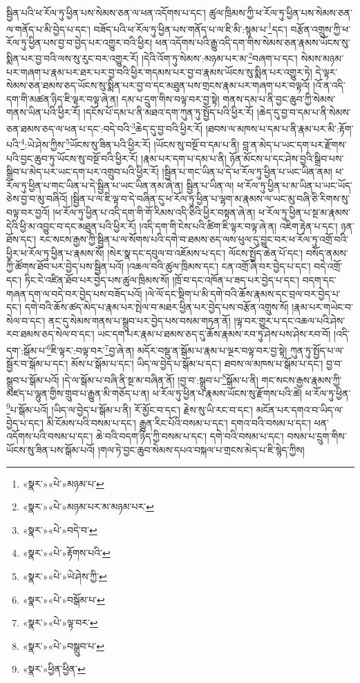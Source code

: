 སྦྱིན་པའི་ཕ་རོལ་ཏུ་ཕྱིན་པས་སེམས་ཅན་ལ་ཕན་འདོགས་པ་དང་། ཚུལ་ཁྲིམས་ཀྱི་ཕ་རོལ་ཏུ་ཕྱིན་པས་སེམས་ཅན་ལ་གནོད་པ་མི་བྱེད་པ་དང་། བཟོད་པའི་ཕ་རོལ་ཏུ་ཕྱིན་པས་གནོད་པ་ལ་ཇི་མི་:སྙམ་པ་\footnote{«སྣར་»«པེ་»མཉམ་པ་}དང་། བརྩོན་འགྲུས་ཀྱི་ཕ་རོལ་ཏུ་ཕྱིན་པས་བྱ་བ་བྱེད་པར་འགྱུར་བའི་ཕྱིར། ཕན་འདོགས་པའི་རྒྱུ་འདི་དག་གིས་སེམས་ཅན་རྣམས་ཡོངས་སུ་སྨིན་པར་བྱ་བའི་ལས་སུ་རུང་བར་འགྱུར་རོ། །དེའི་འོག་ཏུ་སེམས་:མཉམ་པར་མ་\footnote{«སྣར་»«པེ་»མཉམ་པར་མ་མཉམ་པར་}བཞག་པ་དང་། སེམས་མཉམ་པར་གཞག་པ་རྣམ་པར་ཐར་པར་བྱ་བའི་ཕྱིར་གདམས་པར་བྱ་བ་རྣམས་ཡོངས་སུ་སྨིན་པར་འགྱུར་ཏེ། དེ་ལྟར་སེམས་ཅན་ཐམས་ཅད་ཡོངས་སུ་སྨིན་པར་བྱ་བ་དང་མཐུན་པས་གྲངས་རྣམ་པར་གཞག་པར་བལྟའོ། །འོ་ན་འདི་དག་གི་མཚན་ཉིད་ཇི་ལྟར་བལྟ་ཞེ་ན། དམ་པ་དྲུག་གིས་བལྟ་བར་བྱ་སྟེ། གནས་དམ་པ་ནི་བྱང་ཆུབ་ཀྱི་སེམས་གནས་ཡིན་པའི་ཕྱིར་རོ། །དངོས་པོ་དམ་པ་ནི་མཐའ་དག་ཀུན་ཏུ་སྤྱོད་པའི་ཕྱིར་རོ། །ཆེད་དུ་བྱ་བ་དམ་པ་ནི་སེམས་ཅན་ཐམས་ཅད་ལ་ཕན་པ་དང་:བདེ་བའི་\footnote{«སྣར་»«པེ་»བདེ་བ་}ཆེད་དུ་བྱ་བའི་ཕྱིར་རོ། །ཐབས་ལ་མཁས་པ་དམ་པ་ནི་རྣམ་པར་མི་:རྟོག་པའི་\footnote{«སྣར་»«པེ་»རྟོགས་པའི་}:ཡེ་ཤེས་ཀྱིས་\footnote{«སྣར་»«པེ་»ཡེ་ཤེས་ཀྱི་}ཡོངས་སུ་ཟིན་པའི་ཕྱིར་རོ། །ཡོངས་སུ་བསྔོ་བ་དམ་པ་ནི། བླ་ན་མེད་པ་ཡང་དག་པར་རྫོགས་པའི་བྱང་ཆུབ་ཏུ་ཡོངས་སུ་བསྔོ་བའི་ཕྱིར་རོ། །རྣམ་པར་དག་པ་དམ་པ་ནི། ཉོན་མོངས་པ་དང་ཤེས་བྱའི་སྒྲིབ་པས་སྒྲིབ་པ་མེད་པར་ཡང་དག་པར་འགྲུབ་པའི་ཕྱིར་རོ། །སྦྱིན་པ་གང་ཡིན་པ་དེ་ཕ་རོལ་ཏུ་ཕྱིན་པ་ཡང་ཡིན་ནམ། ཕ་རོལ་ཏུ་ཕྱིན་པ་གང་ཡིན་པ་དེ་སྦྱིན་པ་ཡང་ཡིན་ནམ་ཞེ་ན། སྦྱིན་པ་ཡིན་ལ། ཕ་རོལ་ཏུ་ཕྱིན་པ་མ་ཡིན་པ་ཡང་ཡོད་ཅེས་བྱ་བ་མུ་བཞིའོ། །སྦྱིན་པ་ལ་ཇི་ལྟ་བ་དེ་བཞིན་དུ་ཕ་རོལ་ཏུ་ཕྱིན་པ་ལྷག་མ་རྣམས་ལ་ཡང་མུ་བཞི་ཅི་རིགས་སུ་བལྟ་བར་བྱའོ། །ཕ་རོལ་ཏུ་ཕྱིན་པ་འདི་དག་གི་གོ་རིམས་འདི་ཅིའི་ཕྱིར་བསྟན་ཞེ་ན། ཕ་རོལ་ཏུ་ཕྱིན་པ་སྔ་མ་རྣམས་དེའི་ཕྱི་མ་འབྱུང་བ་དང་མཐུན་པའི་ཕྱིར་རོ། །འདི་དག་གི་ངེས་པའི་ཚིག་ཇི་ལྟར་བལྟ་ཞེ་ན། འཇིག་རྟེན་པ་དང་། ཉན་ཐོས་དང་། རང་སངས་རྒྱས་ཀྱི་སྦྱིན་པ་ལ་སོགས་པའི་དགེ་བ་ཐམས་ཅད་ལས་ཕུལ་དུ་བྱུང་བར་ཕ་རོལ་ཏུ་འགྲོ་བའི་ཕྱིར་ཕ་རོལ་ཏུ་ཕྱིན་པ་རྣམས་སོ། །སེར་སྣ་དང་དབུལ་བ་འཇོམས་པ་དང་། ལོངས་སྤྱོད་ཆེན་པོ་དང་། བསོད་ནམས་ཀྱི་ཚོགས་ཐོབ་པར་བྱེད་པས་སྦྱིན་པའོ། །འཆལ་བའི་ཚུལ་ཁྲིམས་དང་། ངན་འགྲོ་ཞི་བར་བྱེད་པ་དང་། བདེ་འགྲོ་དང་། ཏིང་ངེ་འཛིན་ཐོབ་པར་བྱེད་པས་ཚུལ་ཁྲིམས་སོ། །ཁྲོ་བ་དང་འཁོན་པ་ཟད་པར་བྱེད་པ་དང་། བདག་དང་གཞན་དག་ལ་བདེ་བར་བྱེད་པས་བཟོད་པའོ། །ལེ་ལོ་དང་སྡིག་པ་མི་དགེ་བའི་ཆོས་རྣམས་དང་བྲལ་བར་བྱེད་པ་དང་། དགེ་བའི་ཆོས་ཚད་མེད་པ་རྣམ་པར་སྤེལ་བ་མཐར་ཕྱིན་པར་བྱེད་པས་བརྩོན་འགྲུས་སོ། །རྣམ་པར་གཡེང་བ་སེལ་བ་དང་། ནང་དུ་སེམས་གནས་པ་སྒྲུབ་པར་བྱེད་པས་བསམ་གཏན་ནོ། །ལྟ་བར་གྱུར་པ་དང་འཆལ་པའི་ཤེས་རབ་ཐམས་ཅད་སེལ་བ་དང་། ཡང་དག་པར་རྣམ་པ་ཐམས་ཅད་དུ་ཆོས་རྣམས་རབ་ཏུ་ཤེས་པས་ཤེས་རབ་བོ། །འདི་དག་:སྒོམ་པ་\footnote{«སྣར་»«པེ་»བསྒོམ་པ་}ཇི་ལྟར་:བལྟ་བར་\footnote{«སྣར་»«པེ་»ལྟ་བར་}བྱ་ཞེ་ན། མདོར་བསྡུ་ན་སྒོམ་པ་རྣམ་པ་ལྔར་བལྟ་བར་བྱ་སྟེ། ཀུན་ཏུ་སྤྱོད་པ་ལ་སྦྱོར་བ་སྒོམ་པ་དང་། མོས་པ་སྒོམ་པ་དང་། ཡིད་ལ་བྱེད་པ་སྒོམ་པ་དང་། ཐབས་ལ་མཁས་པ་སྒོམ་པ་དང་། བྱ་བ་སྒྲུབ་པ་སྒོམ་པའོ། །དེ་ལ་སྒོམ་པ་བཞི་ནི་སྔ་མ་བཞིན་ནོ། །བྱ་བ་:སྒྲུབ་པ་\footnote{«སྣར་»«པེ་»བསྒྲུབ་པ་}སྒོམ་པ་ནི། གང་སངས་རྒྱས་རྣམས་ཀྱི་མཛད་པ་ལྷུན་གྱིས་གྲུབ་པ་རྒྱུན་མི་གཅོད་པ་ན། ཕ་རོལ་ཏུ་ཕྱིན་པ་རྣམས་ཡོངས་སུ་རྫོགས་པའི་ཚེ། ཕ་རོལ་ཏུ་ཕྱིན་\footnote{«སྣར་»ཕྱིན་ཕྱིན་}པ་སྒོམ་པའོ། །ཡིད་ལ་བྱེད་པ་སྒོམ་པ་ནི། རོ་མྱོང་བ་དང་། རྗེས་སུ་ཡི་རང་བ་དང་། མངོན་པར་དགའ་བ་ཡིད་ལ་བྱེད་པ་དང་། མི་ངོམས་པའི་བསམ་པ་དང་། རྒྱུན་རིང་པོའི་བསམ་པ་དང་། དགའ་བའི་བསམ་པ་དང་། ཕན་འདོགས་པའི་བསམ་པ་དང་། ཆེ་བའི་བདག་ཉིད་ཀྱི་བསམ་པ་དང་། དགེ་བའི་བསམ་པ་དང་། བསམ་པ་དྲུག་གིས་ཡོངས་སུ་ཟིན་པས་སྒོམ་པའོ། །གལ་ཏེ་བྱང་ཆུབ་སེམས་དཔའ་བསྐལ་པ་གྲངས་མེད་པ་ཇི་སྙེད་ཀྱིས། 